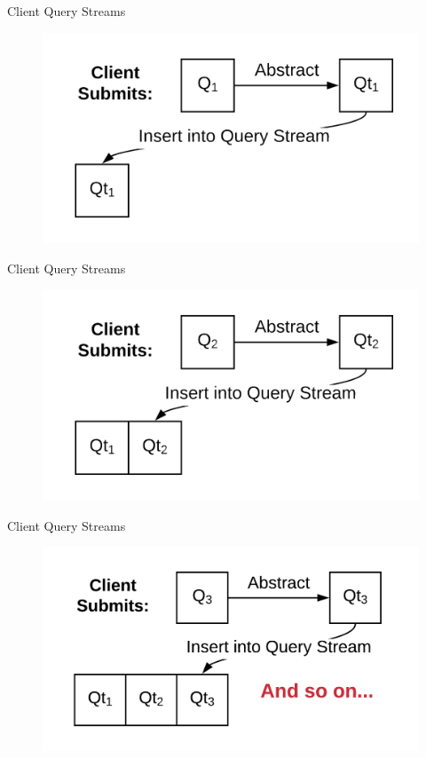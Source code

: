 \documentclass[12pt]{beamer}
\begin{document}
\begin{frame}[fragile]{Client Query Streams}
    \begin{figure}
        \includegraphics[scale=0.2]{apollo_client_query_stream_0_3}
    \end{figure}
\end{frame}

\begin{frame}[fragile]{Client Query Streams}
    \begin{figure}
        \includegraphics[scale=0.2]{apollo_client_query_stream_0_4}
    \end{figure}
\end{frame}

\begin{frame}[fragile]{Client Query Streams}
    \begin{figure}
        \includegraphics[scale=0.2]{apollo_client_query_stream_0_5}
    \end{figure}
\end{frame}
\end{document}
